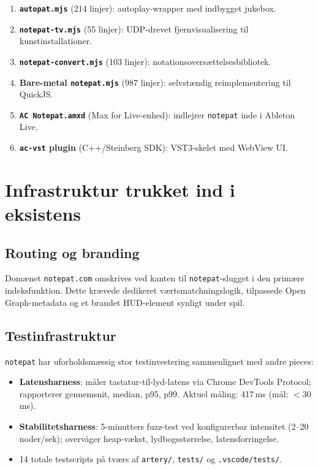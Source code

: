 \documentclass[10pt,letterpaper,twocolumn]{article}
\begin{document}
\begin{enumerate}
  \item \textbf{\texttt{autopat.mjs}} (214 linjer): autoplay-wrapper med indbygget jukebox.
  \item \textbf{\texttt{notepat-tv.mjs}} (55 linjer): UDP-drevet fjernvisualisering til kunstinstallationer.
  \item \textbf{\texttt{notepat-convert.mjs}} (103 linjer): notationsoversættelsesbibliotek.
  \item \textbf{Bare-metal \texttt{notepat.mjs}} (987 linjer): selvstændig reimplementering til QuickJS.
  \item \textbf{\texttt{AC Notepat.amxd}} (Max for Live-enhed): indlejrer \texttt{notepat} inde i Ableton Live.
  \item \textbf{\texttt{ac-vst} plugin} (C++/Steinberg SDK): VST3-skelet med WebView UI.
\end{enumerate}

\section{Infrastruktur trukket ind i eksistens}

\subsection{Routing og branding}

Domænet \texttt{notepat.com} omskrives ved kanten til \texttt{notepat}-slugget i den primære indeksfunktion. Dette krævede dedikeret værtsmatchningslogik, tilpassede Open Graph-metadata og et brandet HUD-element synligt under spil.

\subsection{Testinfrastruktur}

\texttt{notepat} har uforholdsmæssig stor testinvestering sammenlignet med andre pieces:

\begin{itemize}
  \item \textbf{Latensharness}: måler tastatur-til-lyd-latens via Chrome DevTools Protocol; rapporterer gennemsnit, median, p95, p99. Aktuel måling: 417\,ms (mål: $<$30\,ms).
  \item \textbf{Stabilitetsharness}: 5-minutters fuzz-test ved konfigurerbar intensitet (2--20 noder/sek); overvåger heap-vækst, lydbogsstørrelse, latensforringelse.
  \item 14 totale testscripts på tværs af \texttt{artery/}, \texttt{tests/} og \texttt{.vscode/tests/}.
\end{itemize}
\end{document}
